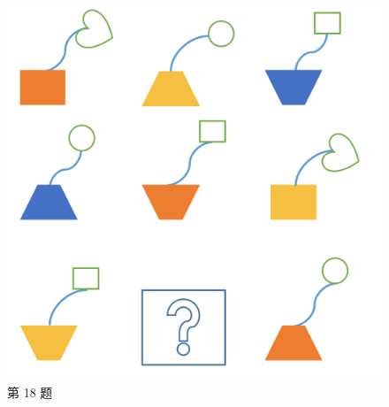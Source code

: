 \documentclass[10pt, a4paper]{article}
\begin{document}
\begin{enumerate}
\begin{figure}[htbp]
\begin{minipage}[t]{.2\textwidth}
                \includegraphics[width=\textwidth]{figure/18.png}
                \caption*{第 18 题}
            \end{minipage}
            \begin{minipage}[t]{.15\textwidth}
                \centering

\end{minipage}
\end{figure}
\end{enumerate}
\end{document}
